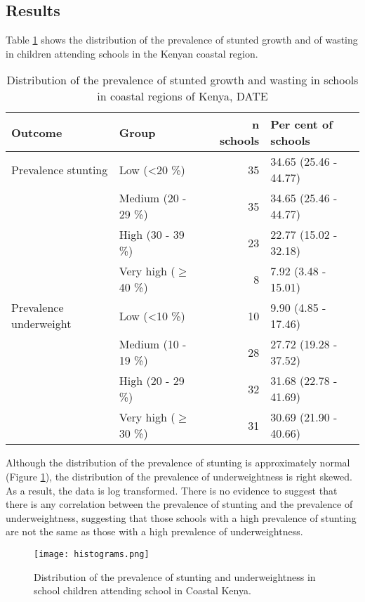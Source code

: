 \documentclass[11pt,a4paper,twoside]{article}\usepackage[]{graphicx}\usepackage[]{color}
\begin{document}
\subsection*{Results}
Table \ref{tab1} shows the distribution of the prevalence of stunted growth and of wasting in children attending schools in the Kenyan coastal region.
\begin{table}[ht]
\centering
\begin{tabular}{llrl}
  \toprule
Outcome & Group & n schools & Per cent of schools \\ 
  \midrule
Prevalence stunting & Low (\textless 20 \%) & 35 & 34.65 (25.46 - 44.77) \\ 
   & Medium (20 - 29 \%) & 35 & 34.65 (25.46 - 44.77) \\ 
   & High (30 - 39 \%) & 23 & 22.77 (15.02 - 32.18) \\ 
   & Very high ($\ge$ 40 \%) & 8 & 7.92 (3.48 - 15.01) \\ 
  Prevalence underweight & Low (\textless 10 \%) & 10 & 9.90 (4.85 - 17.46) \\ 
   & Medium (10 - 19 \%) & 28 & 27.72 (19.28 - 37.52) \\ 
   & High (20 - 29 \%) & 32 & 31.68 (22.78 - 41.69) \\ 
   & Very high ($\ge$ 30 \%) & 31 & 30.69 (21.90 - 40.66) \\ 
   \bottomrule
\end{tabular}
\caption{Distribution of the prevalence of stunted growth and wasting in schools in coastal regions of Kenya, DATE} 
\label{tab1}
\end{table}


Although the distribution of the prevalence of stunting is approximately normal (Figure \ref{dist}), the distribution of the prevalence of underweightness is right skewed. 
As a result, the data is log transformed. 
There is no evidence to suggest that there is any correlation between the prevalence of stunting and the prevalence of underweightness, suggesting that those schools with a high prevalence of stunting are not the same as those with a high prevalence of underweightness. 
\begin{figure}[b]
\texttt{[image: histograms.png]}
\caption{Distribution of the prevalence of stunting and underweightness in school children attending school in Coastal Kenya.}
\label{dist}
\end{figure}
\end{document}
